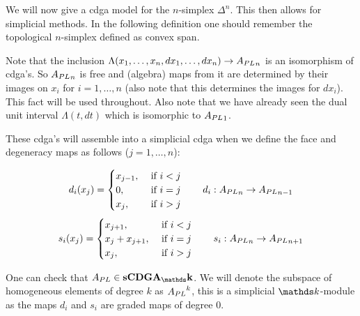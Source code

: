 
We will now give a cdga model for the $n$-simplex $\Delta^n$. This then allows for simplicial methods. In the following definition one should remember the topological $n$-simplex defined as convex span.


Note that the inclusion $\Lambda(x_1, \ldots, x_n, d x_1, \ldots, d x_n) \to {A_{PL}}_n$ is an isomorphism of cdga's. So ${A_{PL}}_n$ is free and (algebra) maps from it are determined by their images on $x_i$ for $i = 1, \ldots, n$ (also note that this determines the images for $d x_i$). This fact will be used throughout. Also note that we have already seen the dual unit interval $\Lambda(t, dt)$ which is isomorphic to ${A_{PL}}_1$.

These cdga's will assemble into a simplicial cdga when we define the face and degeneracy maps as follows ($j = 1, \ldots, n$):

$$ d_i(x_j) = \begin{cases}
	x_{j-1}, &\text{ if } i < j \\
	0,       &\text{ if } i = j \\
	x_j,     &\text{ if } i > j
\end{cases} \qquad d_i : {A_{PL}}_n \to {A_{PL}}_{n-1} $$
$$ s_i(x_j) = \begin{cases}
	x_{j+1},       &\text{ if } i < j \\
	x_j + x_{j+1}, &\text{ if } i = j \\
	x_j,           &\text{ if } i > j	
\end{cases} \qquad s_i : {A_{PL}}_n \to {A_{PL}}_{n+1} $$

One can check that $\Apl \in \simplicial{\CDGA_\k}$. We will denote the subspace of homogeneous elements of degree $k$ as ${A_{PL}}^k$, this is a simplicial $\k$-module as the maps $d_i$ and $s_i$ are graded maps of degree $0$.

